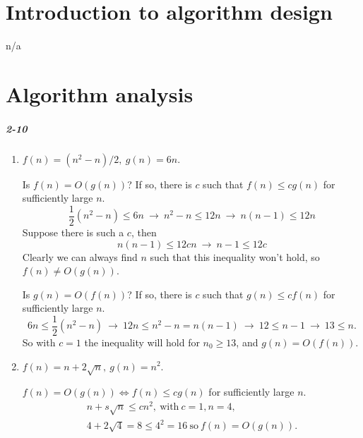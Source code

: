 \documentclass{report}
\begin{document}
\chapter{Introduction to algorithm design}

n/a

\chapter{Algorithm analysis}

\paragraph{2-10}
\begin{enumerate}[label=\alph*)]
	\item $f(n) = (n^2 - n)/2,\ g(n) = 6n.$
	
		Is $f(n) = O(g(n))$? If so, there is $c$ such that $f(n) \le cg(n)$
		for sufficiently large $n$.
		\begin{equation*}
			\frac{1}{2}\left(n^2 - n\right) \le 6n
				\ \rightarrow\ n^2 - n \le 12n
				\ \rightarrow\ n(n-1) \le 12n
		\end{equation*}
		Suppose there is such a $c$, then
		\begin{equation*}
			n(n-1) \le 12cn\ \rightarrow\ n-1 \le 12c
		\end{equation*}
		Clearly we can always find $n$ such that this inequality won't hold,
		so $f(n) \ne O(g(n))$.
		
		Is $g(n) = O(f(n))$? If so, there is $c$ such that $g(n) \le cf(n)$
		for sufficiently large $n$.
		\begin{equation*}
			6n \le \frac{1}{2}\left(n^2 - n\right)
			\ \rightarrow\ 12n \le n^2 - n = n(n-1)
			\ \rightarrow\ 12 \le n - 1
			\ \rightarrow\ 13 \le n.
		\end{equation*}
		So with $c = 1$ the inequality will hold for $n_0 \ge 13$, and $g(n) = O(f(n))$.
		
	\item $f(n) = n + 2\sqrt{n},\ g(n) = n^2.$
	
		$f(n) = O(g(n)) \Leftrightarrow f(n) \le cg(n)$ for sufficiently large $n$.
		\begin{gather*}
			n + s\sqrt{n} \le cn^2,\ \text{with}\ c = 1, n = 4, \\
			4 + 2\sqrt{4} = 8 \le 4^2 = 16\ \text{so}\ f(n) = O(g(n)).
		\end{gather*}
\end{enumerate}
\end{document}
